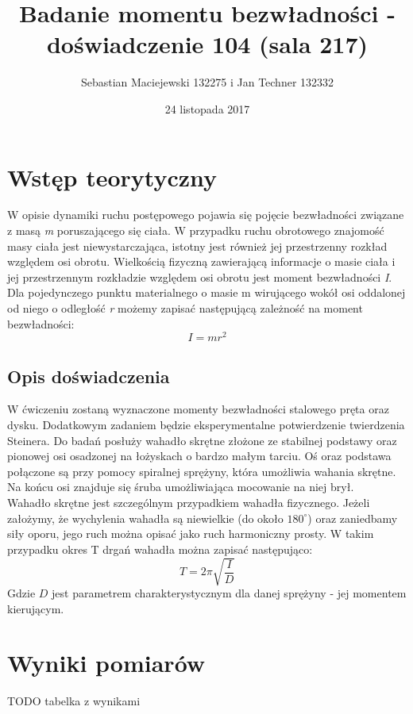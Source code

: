 \documentclass[10pt,a4paper]{article}
\author{Sebastian Maciejewski 132275 i Jan Techner 132332}
\title{Badanie momentu bezwładności - \\ doświadczenie 104 (sala 217)}
\date{24 listopada 2017}
\newcommand{\forceindent}{\leavevmode{\parindent=3em\indent}}
\begin{document}
\maketitle
\section{Wstęp teorytyczny}
\forceindent W opisie dynamiki ruchu postępowego pojawia się pojęcie bezwładności związane z masą \textit{m}
poruszającego się ciała. W przypadku ruchu obrotowego znajomość masy ciała jest niewystarczająca, istotny
jest również jej przestrzenny rozkład względem osi obrotu. Wielkością fizyczną zawierającą informacje o
masie ciała i jej przestrzennym rozkładzie względem osi obrotu jest moment bezwładności \textit{I}.\\
\forceindent Dla pojedynczego punktu materialnego o masie m wirującego wokół osi oddalonej od niego o
odległość \textit{r} możemy zapisać następującą zależność na moment bezwładności:
\begin{equation}
I=mr^2
\end{equation}

\subsection*{Opis doświadczenia}

\forceindent W ćwiczeniu zostaną wyznaczone momenty bezwładności stalowego pręta oraz dysku. Dodatkowym
zadaniem będzie eksperymentalne potwierdzenie twierdzenia Steinera. Do badań posłuży wahadło skrętne
złożone ze stabilnej podstawy oraz pionowej osi osadzonej na łożyskach o bardzo małym tarciu. Oś oraz
podstawa połączone są przy pomocy spiralnej sprężyny, która umożliwia wahania skrętne. Na końcu osi
znajduje się śruba umożliwiająca mocowanie na niej brył.\\
\forceindent Wahadło skrętne jest szczególnym przypadkiem wahadła fizycznego. Jeżeli założymy, że wychylenia
wahadła są niewielkie (do około $180^{\circ}$) oraz zaniedbamy siły oporu, jego ruch można opisać jako ruch
harmoniczny prosty. W takim przypadku okres T drgań wahadła można zapisać następująco:
\begin{equation}
T = 2 \pi \sqrt{\frac{I}{D}}
\end{equation}
Gdzie $D$ jest parametrem charakterystycznym dla danej sprężyny - jej momentem kierującym.

\newpage
\section{Wyniki pomiarów}
TODO tabelka z wynikami
\end{document}
